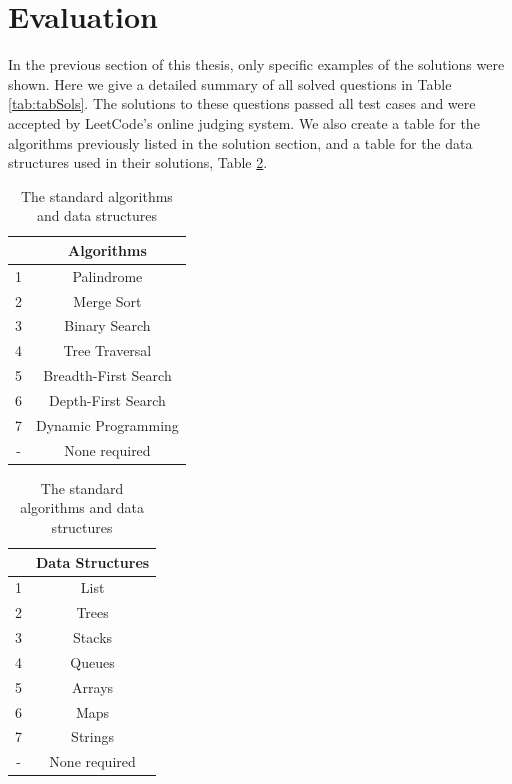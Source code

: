 \documentclass[conference]{IEEEtran}
\begin{document}
\section{Evaluation}
In the previous section of this thesis, only specific examples of the solutions were shown. Here we give a detailed summary of all solved questions in Table \ref{tab:tabSols}. The solutions to these questions passed all test cases and were accepted by LeetCode's online judging system. We also create a table for the algorithms previously listed in the solution section, and a table for the data structures used in their solutions, Table \ref{tab:classicalAlgos}.
\begin{table}
\parbox{.45\linewidth}{
\centering
\begin{tabular}{|c|c|} \hline
		    & {\bf Algorithms} \\ \hline
		1 & Palindrome\\ \hline
		2 & Merge Sort\\ \hline
		3 & Binary Search\\ \hline
		4 & Tree Traversal \\ \hline
		5 & Breadth-First Search\\ \hline
		6 & Depth-First Search\\ \hline
		7 & Dynamic Programming\\ \hline
		- & None required\\ \hline
\end{tabular}
\caption{The standard algorithms and data structures}
\label{tab:classicalAlgos}
}
\hfill
\parbox{.45\linewidth}{
\centering
\begin{tabular}{|c|c|} \hline
	&{\bf Data Structures} \\ \hline
	1 & List\\ \hline
	2 & Trees\\ \hline
	3 & Stacks\\ \hline
	4 & Queues \\ \hline
	5 & Arrays\\ \hline
	6 & Maps\\ \hline	
	7&Strings\\ \hline
	-&None required\\ \hline
\end{tabular}
}

\end{table}
\end{document}
